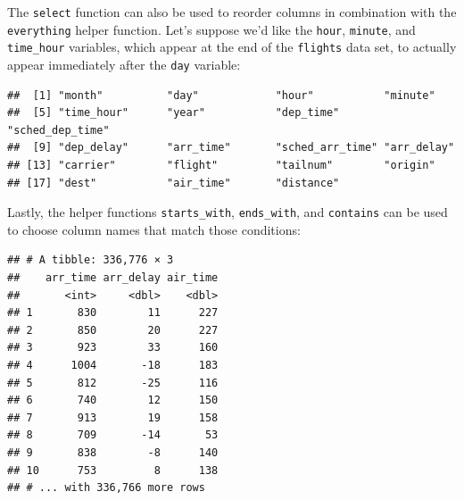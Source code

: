 \documentclass[]{tufte-book}
\newenvironment{Shaded}{\begin{snugshade}}{\end{snugshade}}
\newcommand{\KeywordTok}[1]{\textcolor[rgb]{0.13,0.29,0.53}{\textbf{{#1}}}}
\newcommand{\StringTok}[1]{\textcolor[rgb]{0.31,0.60,0.02}{{#1}}}
\newcommand{\NormalTok}[1]{{#1}}
\begin{document}
The \texttt{select} function can also be used to reorder columns in
combination with the \texttt{everything} helper function. Let's suppose
we'd like the \texttt{hour}, \texttt{minute}, and \texttt{time\_hour}
variables, which appear at the end of the \texttt{flights} data set, to
actually appear immediately after the \texttt{day} variable:

\begin{Shaded}
\end{Shaded}

\begin{verbatim}
##  [1] "month"          "day"            "hour"           "minute"        
##  [5] "time_hour"      "year"           "dep_time"       "sched_dep_time"
##  [9] "dep_delay"      "arr_time"       "sched_arr_time" "arr_delay"     
## [13] "carrier"        "flight"         "tailnum"        "origin"        
## [17] "dest"           "air_time"       "distance"
\end{verbatim}

Lastly, the helper functions \texttt{starts\_with}, \texttt{ends\_with},
and \texttt{contains} can be used to choose column names that match
those conditions:

\begin{Shaded}
\end{Shaded}

\begin{verbatim}
## # A tibble: 336,776 × 3
##    arr_time arr_delay air_time
##       <int>     <dbl>    <dbl>
## 1       830        11      227
## 2       850        20      227
## 3       923        33      160
## 4      1004       -18      183
## 5       812       -25      116
## 6       740        12      150
## 7       913        19      158
## 8       709       -14       53
## 9       838        -8      140
## 10      753         8      138
## # ... with 336,766 more rows
\end{verbatim}
\end{document}
